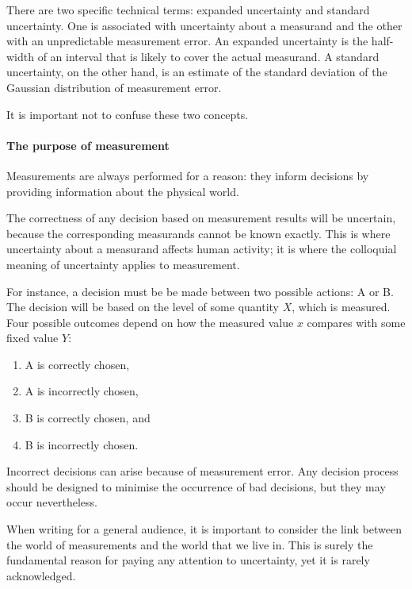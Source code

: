There are two specific technical terms: expanded uncertainty and standard uncertainty. One is associated with uncertainty about a measurand and the other with an unpredictable measurement error. An expanded uncertainty is the half-width of an interval that is likely to cover the actual measurand. A standard uncertainty, on the other hand, is an estimate of the standard deviation of the Gaussian distribution of measurement error.

It is important not to confuse these two concepts.

\paragraph{The purpose of measurement}
Measurements are always performed for a reason: they inform decisions by providing information about the physical world. 

The correctness of any decision based on measurement results will be uncertain, because the corresponding measurands cannot be known exactly. This is where uncertainty about a measurand affects human activity; it is where the colloquial meaning of uncertainty applies to measurement. 

For instance, a decision must be be made between two possible actions: A or B. The decision will be based on the level of some quantity $X$, which is measured. Four possible outcomes depend on how the measured value $x$ compares with some fixed value $Y$: 
\begin{enumerate}[label=\roman*)]
\item A is correctly chosen, 
\item A is incorrectly chosen, 
\item B is correctly chosen, and 
\item B is incorrectly chosen.
\end{enumerate} 
Incorrect decisions can arise because of measurement error. Any decision process should be designed to minimise the occurrence of bad decisions, but they may occur nevertheless. 

When writing for a general audience, it is important to consider the link between the world of measurements and the world that we live in. This is surely the fundamental reason for paying any attention to uncertainty, yet it is rarely acknowledged. 

